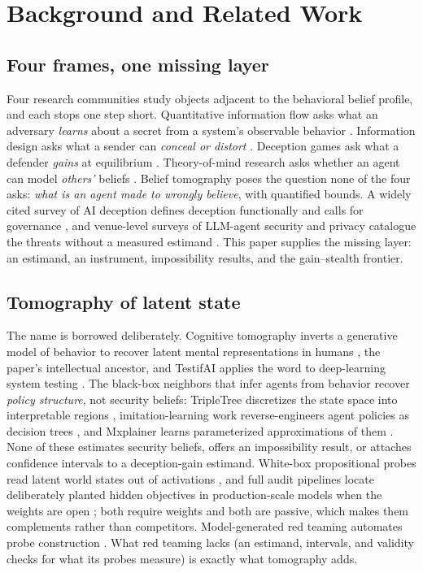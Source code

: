 \section{Background and Related Work}\label{sec:related}

\subsection{Four frames, one missing layer}\label{sec:frames}

Four research communities study objects adjacent to the behavioral belief
profile, and each stops one step short. Quantitative information flow asks
what an adversary \emph{learns} about a secret from a system's observable
behavior \cite{smith2009,alvim2020}. Information design asks what a sender
can \emph{conceal or distort} \cite{kamenica2011}. Deception games ask what
a defender \emph{gains} at equilibrium \cite{nguyen2019}. Theory-of-mind
research asks whether an agent can model \emph{others'} beliefs
\cite{strachan2024}. Belief tomography poses the question none of the four
asks: \emph{what is an agent made to wrongly believe}, with quantified bounds. A widely cited survey of AI deception defines
deception functionally and calls for governance
\cite{park2024}, and venue-level surveys of LLM-agent security and privacy
catalogue the threats without a measured estimand
\cite{he2025survey}. This paper supplies the missing layer: an estimand, an
instrument, impossibility results, and the gain--stealth frontier.


\subsection{Tomography of latent state}

The name is borrowed deliberately. Cognitive tomography inverts a generative
model of behavior to recover latent mental representations in humans
\cite{houlsby2013}, the paper's intellectual ancestor, and TestifAI applies
the word to deep-learning system testing \cite{testifai}. The
black-box neighbors that infer agents from behavior recover \emph{policy
structure}, not security beliefs: TripleTree discretizes the state space
into interpretable regions \cite{tripletree2020}, imitation-learning work
reverse-engineers agent policies as decision trees \cite{bewley2020}, and
Mxplainer learns parameterized approximations of them
\cite{mxplainer2025}. None of these estimates security beliefs, offers an
impossibility result, or attaches confidence intervals to a deception-gain
estimand. White-box propositional probes read latent world states out of
activations \cite{feng2024}, and full audit pipelines locate deliberately
planted hidden objectives in production-scale models when the weights are
open \cite{marks2025audit}; both require weights and both are passive,
which makes them complements rather than competitors. Model-generated red
teaming automates probe construction \cite{perez2022redteam}. What red
teaming lacks (an estimand, intervals, and validity checks for what its
probes measure) is exactly what tomography adds.

